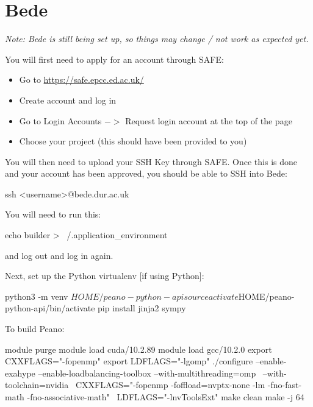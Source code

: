 


\section{Bede}
\emph{Note: Bede is still being set up, so things may change / not work as expected yet.}

You will first need to apply for an account through SAFE:
\begin{itemize}
  \item Go to \url{https://safe.epcc.ed.ac.uk/}
  \item Create account and log in
  \item Go to Login Accounts $->$ Request login account at the top of the page
  \item Choose your project (this should have been provided to you)
\end{itemize}
You will then need to upload your SSH Key through SAFE.
Once this is done and your account has been approved, you should be able to SSH into Bede:

\begin{code}
ssh <username>@bede.dur.ac.uk
\end{code}

You will need to run this:
\begin{code}
  echo builder > ~/.application_environment
\end{code}
and log out and log in again.

Next, set up the Python virtualenv [if using Python]:
\begin{code}
python3 -m venv $HOME/peano-python-api
source activate $HOME/peano-python-api/bin/activate
pip install jinja2 sympy
\end{code}

To build Peano:
\begin{code}
 module purge
 module load cuda/10.2.89
 module load gcc/10.2.0
 export CXXFLAGS="-fopenmp"
 export LDFLAGS="-lgomp"
 ./configure --enable-exahype --enable-loadbalancing-toolbox --with-multithreading=omp \
    --with-toolchain=nvidia \
    CXXFLAGS="-fopenmp -foffload=nvptx-none -lm -fno-fast-math -fno-associative-math" \
    LDFLAGS="-lnvToolsExt"
 make clean
 make -j 64
\end{code}

